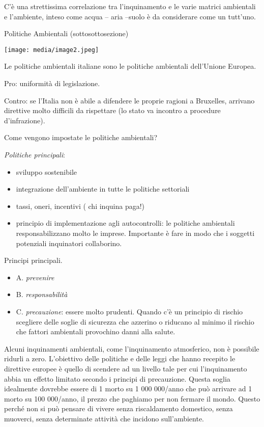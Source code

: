 \documentclass[]{article}
\begin{document}
C'è una strettissima correlazione tra l'inquinamento e le varie matrici
ambientali e l'ambiente, inteso come acqua -- aria --suolo è da
considerare come un tutt'uno.

Politiche Ambientali (sottosottosezione)

\texttt{[image: media/image2.jpeg]}

Le politiche ambientali italiane sono le politiche ambientali
dell'Unione Europea.

Pro: uniformità di legislazione.

Contro: se l'Italia non è abile a difendere le proprie ragioni a
Bruxelles, arrivano direttive molto difficili da rispettare (lo stato va
incontro a procedure d'infrazione).

Come vengono impostate le politiche ambientali?

\emph{Politiche principali}:

\begin{itemize}
\item
  sviluppo sostenibile
\item
  integrazione dell'ambiente in tutte le politiche settoriali
\item
  tassi, oneri, incentivi ( chi inquina paga!)
\item
  principio di implementazione agli autocontrolli: le politiche
  ambientali responsabilizzano molto le imprese. Importante è fare in
  modo che i soggetti potenziali inquinatori collaborino.
\end{itemize}

Principi principali.

\begin{itemize}
\item
  A. \emph{prevenire}
\item
  B. \emph{responsabilità}
\item
  C. \emph{precauzione}: essere molto prudenti. Quando c'è un principio
  di rischio scegliere delle soglie di sicurezza che azzerino o riducano
  al minimo il rischio che fattori ambientali provochino danni alla
  salute.
\end{itemize}

Alcuni inquinamenti ambientali, come l'inquinamento atmosferico, non è
possibile ridurli a zero. L'obiettivo delle politiche e delle leggi che
hanno recepito le direttive europee è quello di scendere ad un livello
tale per cui l'inquinamento abbia un effetto limitato secondo i principi
di precauzione. Questa soglia idealmente dovrebbe essere di 1 morto su 1
000 000/anno che può arrivare ad 1 morto su 100 000/anno, il prezzo che
paghiamo per non fermare il mondo. Questo perché non si può pensare di
vivere senza riscaldamento domestico, senza muoverci, senza determinate
attività che incidono sull'ambiente.
\end{document}
